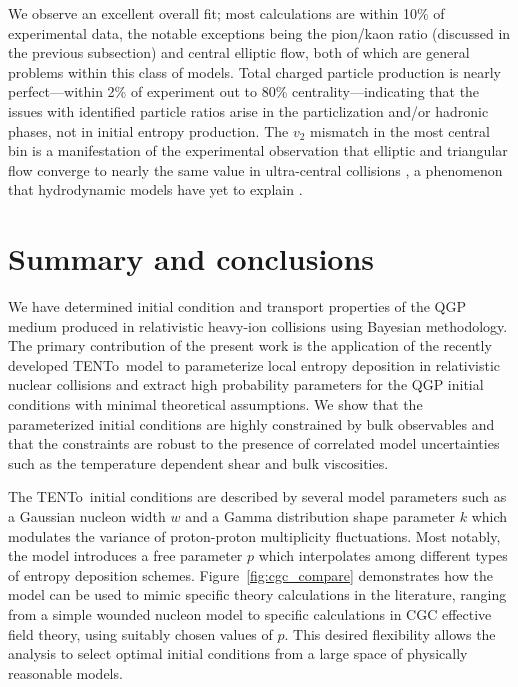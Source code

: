 \documentclass[aps,prc,reprint,amsmath,nofootinbib,superscriptaddress]{revtex4-1}
\newcommand{\trento}{T\raisebox{-0.5ex}{R}ENTo}
\begin{document}
We observe an excellent overall fit; most calculations are within 10\% of experimental data, the notable exceptions being the pion/kaon ratio (discussed in the previous subsection) and central elliptic flow, both of which are general problems within this class of models.
Total charged particle production is nearly perfect---within 2\% of experiment out to 80\% centrality---indicating that the issues with identified particle ratios arise in the particlization and/or hadronic phases, not in initial entropy production.
The $v_2$ mismatch in the most central bin is a manifestation of the experimental observation that elliptic and triangular flow converge to nearly the same value in ultra-central collisions \cite{CMS:2013bza}, a phenomenon that hydrodynamic models have yet to explain \cite{Denicol:2014ywa,Shen:2015qta}.


\section{Summary and conclusions}

We have determined initial condition and transport properties of the QGP medium produced in relativistic heavy-ion collisions using Bayesian methodology. The primary contribution of the present work is the application of the recently developed \trento\ model to parameterize local entropy deposition in relativistic nuclear collisions and extract high probability parameters for the QGP initial conditions with minimal theoretical assumptions. We show that the parameterized initial conditions are highly constrained by bulk observables and that the constraints are robust to the presence of correlated model uncertainties such as the temperature dependent shear and bulk viscosities.

The \trento\ initial conditions are described by several model parameters such as a Gaussian nucleon width $w$ and a Gamma distribution shape parameter $k$ which modulates the variance of proton-proton multiplicity fluctuations. Most notably, the model introduces a free parameter $p$ which interpolates among different types of entropy deposition schemes. Figure~\ref{fig:cgc_compare} demonstrates how the model can be used to mimic specific theory calculations in the literature, ranging from a simple wounded nucleon model to specific calculations in CGC effective field theory, using suitably chosen values of $p$. This desired flexibility allows the analysis to select optimal initial conditions from a large space of physically reasonable models. 
\end{document}
